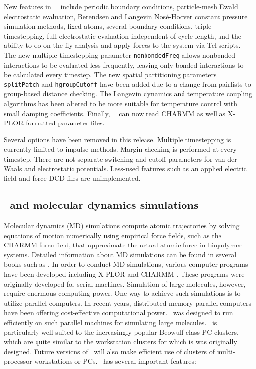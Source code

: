 New features in \NAMD\ \NAMDVER\ include periodic boundary conditions, particle-mesh Ewald electrostatic evaluation, Berendsen and Langevin Nos{\'e}-Hoover constant pressure simulation methods, fixed atoms, several boundary conditions, triple timestepping, full electrostatic evaluation independent of cycle length, and the ability to do on-the-fly analysis and apply forces to the system via Tcl scripts.
The new multiple timestepping parameter {\tt nonbondedFreq} allows nonbonded interactions to be evaluated less frequently, leaving only bonded interactions to be calculated every timestep.
The new spatial partitioning parameters {\tt splitPatch} and {\tt hgroupCutoff} have been added due to a change from pairlists to group-based distance checking.
The Langevin dynamics and temperature coupling algorithms has been altered to be more suitable for temperature control with small damping coefficients.
Finally, \NAMD\ \NAMDVER\ can now read CHARMM as well as X-PLOR formatted 
parameter files.

Several options have been removed in this release.
Multiple timestepping is currently limited to impulse methods.
Margin checking is performed at every timestep.
There are not separate switching and cutoff parameters for van der Waals and electrostatic potentials.
Less-used features such as an applied electric field and force DCD files are unimplemented.

\subsection{\NAMD\ and molecular dynamics simulations}

Molecular dynamics (MD) simulations compute atomic trajectories by solving
equations of motion numerically using empirical force fields, such as the 
CHARMM force field, that approximate the actual atomic force in 
biopolymer systems. Detailed information about MD simulations can be found in
several books such as 
. 
In order to conduct MD simulations, various computer programs have been 
developed including
X-PLOR  and 
CHARMM .
These programs were originally developed for serial machines. 
Simulation of large molecules, however, require enormous computing power. 
One way to achieve such simulations is to utilize parallel computers. In recent 
years, distributed memory parallel computers have been offering
cost-effective computational power.  \NAMD\ was designed to run efficiently
on such parallel 
machines for simulating large molecules. 
\NAMD\ is particularly well suited to the increasingly popular Beowulf-class PC clusters, which are quite similar to the workstation clusters for which is was originally designed.
Future versions of \NAMD\ will also make efficient use of clusters of multi-processor workstations or PCs.
\prettypar
\NAMD\ has several important features: 

